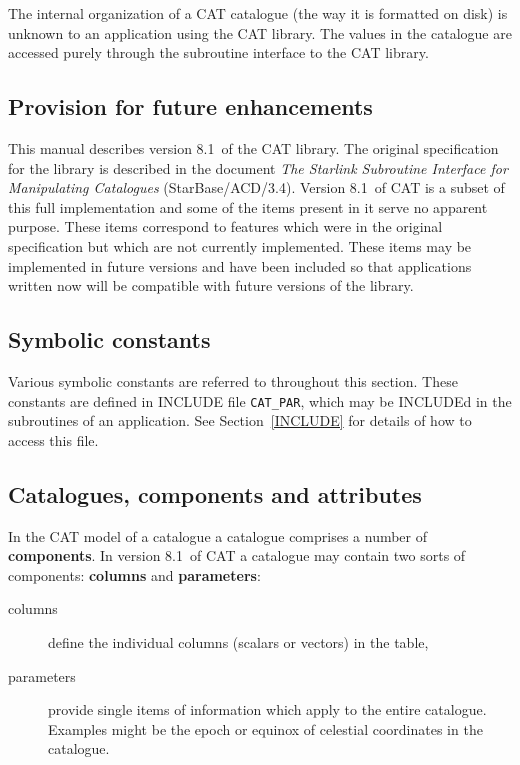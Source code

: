 \documentclass[11pt,twoside]{starlink}
\providecommand{\CATversion}{8.1~}
\begin{document}
The internal organization of a CAT catalogue (the way it is formatted
on disk) is unknown to an application using the CAT library. The values
in the catalogue are accessed purely through the subroutine interface to
the CAT library.


\subsection{Provision for future enhancements}

This manual describes version \CATversion of the CAT library.  The
original specification for the library is described in the document \textit{The Starlink Subroutine Interface for Manipulating Catalogues}
(StarBase/ACD/3.4)\cite{STARBASE34}.  Version \CATversion of CAT is a
subset of this full implementation and some of the items present in it
serve no apparent purpose.  These items correspond to features which were
in the original specification but which are not currently implemented.
These items may be implemented in future versions and have been included
so that applications written now will be compatible with future versions
of the library.

\subsection{Symbolic constants}

Various symbolic constants are referred to throughout this section.
These constants are defined in INCLUDE file \texttt{CAT\_PAR}, which may
be INCLUDEd in the subroutines of an application. See
Section~\ref{INCLUDE} for details of how to access this file.


\subsection{\label{CCA}Catalogues, components and attributes}

In the CAT model of a catalogue a catalogue comprises a number of \textbf{components}. In version \CATversion of CAT a catalogue may contain
two sorts of components: \textbf{columns} and \textbf{parameters}:

\begin{description}

  \item[columns] define the individual columns (scalars or vectors) in
   the table,

  \item[parameters] provide single items of information which apply to
   the entire catalogue. Examples might be the epoch or equinox of
   celestial coordinates in the catalogue.


\end{description}
\end{document}
